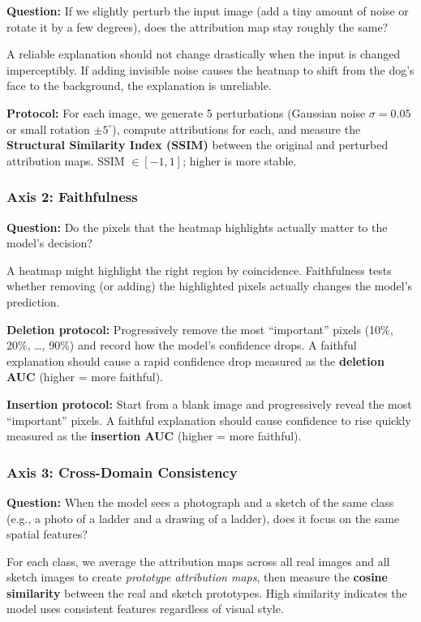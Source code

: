 \documentclass[12pt, a4paper]{article}
\begin{document}
\textbf{Question:} If we slightly perturb the input image (add a tiny amount
of noise or rotate it by a few degrees), does the attribution map stay roughly
the same?

A reliable explanation should not change drastically when the input is changed
imperceptibly.  If adding invisible noise causes the heatmap to shift from the
dog's face to the background, the explanation is unreliable.

\textbf{Protocol:} For each image, we generate 5 perturbations (Gaussian noise
$\sigma = 0.05$ or small rotation $\pm 5^{\circ}$), compute attributions for
each, and measure the \textbf{Structural Similarity Index (SSIM)} between the
original and perturbed attribution maps.  SSIM $\in [-1, 1]$; higher is more
stable.

\subsubsection{Axis 2: Faithfulness}

\textbf{Question:} Do the pixels that the heatmap highlights actually matter to
the model's decision?

A heatmap might highlight the right region by coincidence.  Faithfulness tests
whether removing (or adding) the highlighted pixels actually changes the
model's prediction.

\textbf{Deletion protocol:} Progressively remove the most ``important'' pixels
(10\%, 20\%, \ldots, 90\%) and record how the model's confidence drops.  A
faithful explanation should cause a rapid confidence drop measured as the
\textbf{deletion AUC} (higher = more faithful).

\textbf{Insertion protocol:} Start from a blank image and progressively reveal
the most ``important'' pixels.  A faithful explanation should cause confidence
to rise quickly measured as the \textbf{insertion AUC} (higher = more
faithful).

\subsubsection{Axis 3: Cross-Domain Consistency}

\textbf{Question:} When the model sees a photograph and a sketch of the same
class (e.g., a photo of a ladder and a drawing of a ladder), does it
focus on the same spatial features?

For each class, we average the attribution maps across all real images and all
sketch images to create \emph{prototype attribution maps}, then measure the
\textbf{cosine similarity} between the real and sketch prototypes.  High
similarity indicates the model uses consistent features regardless of visual
style.
\end{document}
